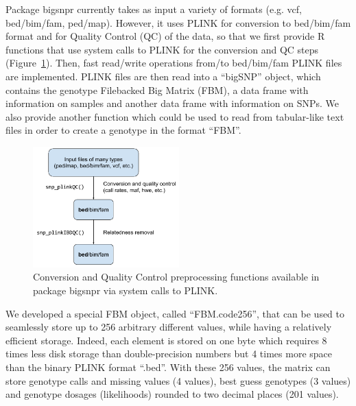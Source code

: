 \documentclass{bioinfo}
\begin{document}
\begin{methods}
Package bigsnpr currently takes as input a variety of formats (e.g. vcf, bed/bim/fam, ped/map). However, it uses PLINK for conversion to bed/bim/fam format and for Quality Control (QC) of the data, so that we first provide R functions that use system calls to PLINK for the conversion and QC steps (Figure~\ref{fig:qc}).
Then, fast read/write operations from/to bed/bim/fam PLINK files are implemented. PLINK files are then read into a ``bigSNP'' object, which contains the genotype Filebacked Big Matrix (FBM), a data frame with information on samples and another data frame with information on SNPs. We also provide another function which could be used to read from tabular-like text files in order to create a genotype in the format ``FBM''.

\begin{figure}[!tpb]
\centerline{\includegraphics[width=160pt]{conversion-QC.pdf}}
\caption{Conversion and Quality Control preprocessing functions available in package bigsnpr via system calls to PLINK.}\label{fig:qc}
\end{figure}

We developed a special FBM object, called ``FBM.code256'', that can be used to seamlessly store up to 256 arbitrary different values, while having a relatively efficient storage. Indeed, each element is stored on one byte which requires 8 times less disk storage than double-precision numbers but 4 times more space than the binary PLINK format ``.bed''. With these 256 values, the matrix can store genotype calls and missing values (4 values), best guess genotypes (3 values) and genotype dosages (likelihoods) rounded to two decimal places (201 values).


\end{methods}
\end{document}
